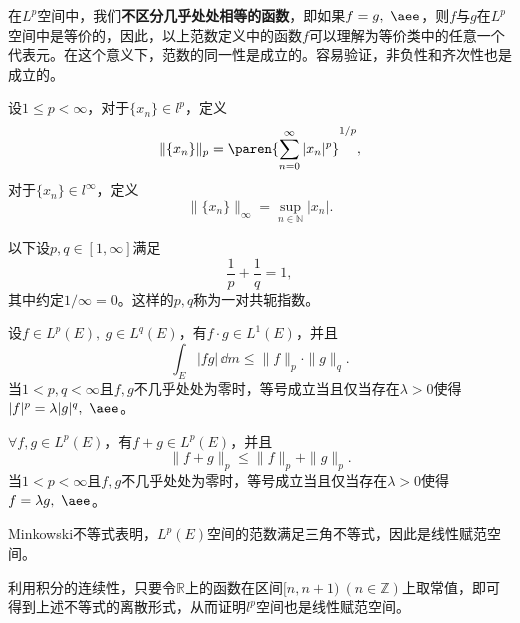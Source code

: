 在$L^p$空间中，我们\textbf{不区分几乎处处相等的函数}，即如果$f=g,\ \aee$，则$f$与$g$在$L^p$空间中是等价的，因此，以上范数定义中的函数$f$可以理解为等价类中的任意一个代表元。在这个意义下，范数的同一性是成立的。容易验证，非负性和齐次性也是成立的。

\begin{definition}[$l^p$空间的范数]
    设$1\leq p<\infty$，对于$\{x_n\}\in l^p$，定义
    \begin{equation}
        \|\{x_n\}\|_p=\paren{\sum_{n=0}^{\infty}|x_n|^p}^{1/p},
    \end{equation}
    对于$\{x_n\}\in l^{\infty}$，定义
    \begin{equation}
        \|\{x_n\}\|_{\infty}=\sup_{n\in \mathbb{N}}|x_n|.
    \end{equation}
\end{definition}

以下设$p,q\in[1,\infty]$满足
\begin{equation}
    \frac{1}{p}+\frac{1}{q}=1,
\end{equation}
其中约定$1/\infty=0$。这样的$p,q$称为一对共轭指数。

\begin{theorem}[Hölder不等式]\label{thm:holder}
    设$f\in L^p(E),\ g\in L^q(E)$，有$f\cdot g\in L^1(E)$，并且
    \begin{equation}
        \int_{E}|fg|\,\dd m\leq \|f\|_p\cdot \|g\|_q.
    \end{equation}
    当$1<p,q<\infty$且$f,g$不几乎处处为零时，等号成立当且仅当存在$\lambda>0$使得$|f|^p=\lambda |g|^q,\ \aee$。
\end{theorem}

\begin{theorem}[Minkowski不等式]\label{thm:minkowski}
    $\forall f,g\in L^p(E)$，有$f+g\in L^p(E)$，并且
    \begin{equation}
        \|f+g\|_p\leq \|f\|_p+\|g\|_p.
    \end{equation}
    当$1<p<\infty$且$f,g$不几乎处处为零时，等号成立当且仅当存在$\lambda>0$使得$f=\lambda g,\ \aee$。
\end{theorem}

Minkowski不等式表明，$L^p(E)$空间的范数满足三角不等式，因此是线性赋范空间。

利用积分的连续性，只要令$\mathbb{R}$上的函数在区间$[n,n+1)\ (n\in\mathbb{Z})$上取常值，即可得到上述不等式的离散形式，从而证明$l^p$空间也是线性赋范空间。

